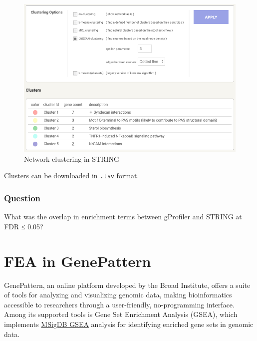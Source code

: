 \documentclass[
]{book}
\begin{document}
\begin{figure}

{\centering \includegraphics[width=1\linewidth]{images/string-clusters} 

}

\caption{Network clustering in STRING}\label{fig:unnamed-chunk-22}
\end{figure}

Clusters can be downloaded in \texttt{.tsv} format.

\hypertarget{question-1}{%
\subsubsection*{\texorpdfstring{\textbf{Question}}{Question}}\label{question-1}}

What was the overlap in enrichment terms between gProfiler and STRING at FDR ≤ 0.05?

\hypertarget{fea-in-genepattern}{%
\section{\texorpdfstring{FEA in GenePattern }{FEA in GenePattern }}\label{fea-in-genepattern}}

GenePattern, an online platform developed by the Broad Institute, offers a suite of tools for analyzing and visualizing genomic data, making bioinformatics accessible to researchers through a user-friendly, no-programming interface. Among its supported tools is Gene Set Enrichment Analysis (GSEA), which implements \href{https://www.gsea-msigdb.org/gsea/index.jsp}{MSigDB GSEA} analysis for identifying enriched gene sets in genomic data.
\end{document}
